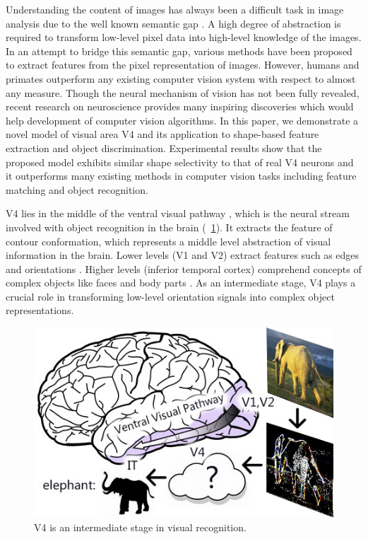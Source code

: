 \documentclass[twocolumn]{article}
\begin{document}
Understanding the content of images has always been a difficult task in image analysis due to the well known semantic gap \cite{smeulders2000}.
A high degree of abstraction is required to transform low-level pixel data into high-level knowledge of the images.
In an attempt to bridge this semantic gap, various methods have been proposed to extract features from the pixel representation of images.
However, humans and primates outperform any existing computer vision system with respect to almost any measure.
Though the neural mechanism of vision has not been fully revealed,
recent research on neuroscience provides many inspiring discoveries which would help development of computer vision algorithms.
In this paper, we demonstrate a novel model of visual area V4 and its application to shape-based feature extraction and object discrimination.
Experimental results show that the proposed model exhibits similar shape selectivity to that of real V4 neurons
and it outperforms many existing methods in computer vision tasks including feature matching and object recognition. 

V4 lies in the middle of the ventral visual pathway \cite{ettlinger1990}, 
which is the neural stream involved with object recognition in the brain (\figurename~\ref{fig:1}).
It extracts the feature of contour conformation, which represents a middle level abstraction of visual information in the brain.
Lower levels (V1 and V2) extract features such as edges and orientations \cite{hubel1962}.
Higher levels (inferior temporal cortex) comprehend concepts of complex objects like faces and body parts \cite{bell2009}.
As an intermediate stage, V4 plays a crucial role in transforming low-level orientation signals into complex object representations.

\begin{figure}[!t]
\centerline{\includegraphics[width=0.8\linewidth]{fig1.jpg}} 
\caption{V4 is an intermediate stage in visual recognition.}
\label{fig:1}
\end{figure}
\end{document}
